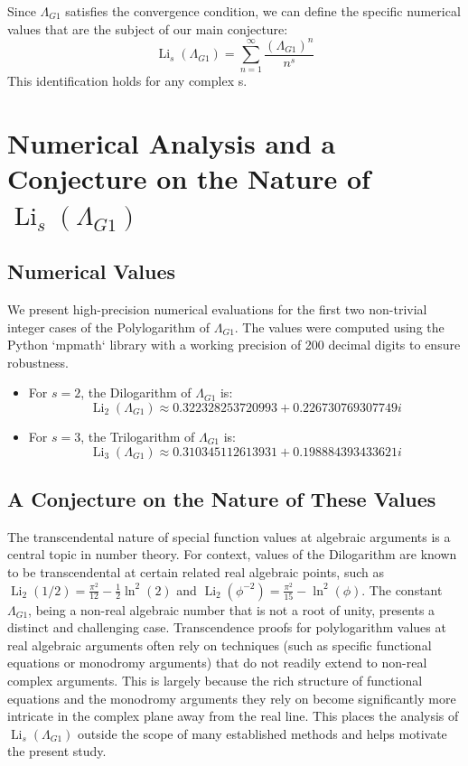 \documentclass{amsart}
\theoremstyle{plain}
\theoremstyle{definition}
\theoremstyle{remark}
\DeclareMathOperator{\Li}{Li} %
\newcommand{\LambdaG}{\Lambda_{G1}}
\newcommand{\phiG}{\phi}
\begin{document}
Since $\LambdaG$ satisfies the convergence condition, we can define the specific numerical values that are the subject of our main conjecture:
$$ \Li_s(\LambdaG) = \sum_{n=1}^{\infty} \frac{(\LambdaG)^{n}}{n^s} $$
This identification holds for any complex s.

\section{Numerical Analysis and a Conjecture on the Nature of \texorpdfstring{$\Li_s(\LambdaG)$}{Li\_s(Lambda\_G1)}}

\subsection{Numerical Values}
We present high-precision numerical evaluations for the first two non-trivial integer cases of the Polylogarithm of $\LambdaG$. The values were computed using the Python `mpmath` library with a working precision of 200 decimal digits to ensure robustness.
\begin{itemize}
    \item For $s=2$, the Dilogarithm of $\LambdaG$ is:
    $$ \Li_2(\LambdaG) \approx 0.322328253720993 + 0.226730769307749i $$
    
    \item For $s=3$, the Trilogarithm of $\LambdaG$ is:
    $$ \Li_3(\LambdaG) \approx 0.310345112613931 + 0.198884393433621i $$
    
\end{itemize}

\subsection{A Conjecture on the Nature of These Values}
The transcendental nature of special function values at algebraic arguments is a central topic in number theory. For context, values of the Dilogarithm are known to be transcendental at certain related real algebraic points, such as $\Li_2(1/2) = \frac{\pi^2}{12} - \frac{1}{2}\ln^2(2)$ and $\Li_2(\phiG^{-2}) = \frac{\pi^2}{15} - \ln^2(\phiG)$. The constant $\LambdaG$, being a non-real algebraic number that is not a root of unity, presents a distinct and challenging case. Transcendence proofs for polylogarithm values at real algebraic arguments often rely on techniques (such as specific functional equations or monodromy arguments) that do not readily extend to non-real complex arguments. This is largely because the rich structure of functional equations and the monodromy arguments they rely on become significantly more intricate in the complex plane away from the real line. This places the analysis of $\Li_s(\LambdaG)$ outside the scope of many established methods and helps motivate the present study.
\end{document}
